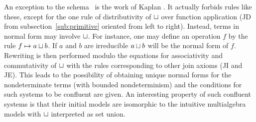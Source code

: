 {An exception to the schema~ is the work of Kaplan \cite{c:63}. It actually forbids rules like these, 
except for the one rule of distributivity of $\sqcup$ over function application 
(JD from subsection~\ref{sub:primitive} oriented from left to 
right). Instead, terms in normal form may involve $\sqcup$. For instance, one may define an operation $f$ by the 
rule $f\mathrel{\mapsto} a\sqcup b$. If $a$ and $b$ are irreducible $a\sqcup b$ will be the normal form of $f$. 
Rewriting is then performed 
modulo the equations for associativity and commutativity of $\sqcup$ with the rules corresponding to other join axioms (JI and JE). 
This leads to the possibility of obtaining unique normal forms for the 
nondeterminate terms (with bounded nondeterminism) and the conditions for such systems to be confluent are 
given. An interesting property of such confluent systems is that their initial models are isomorphic to the 
intuitive multialgebra models with $\sqcup$ interpreted as set union. 

}
